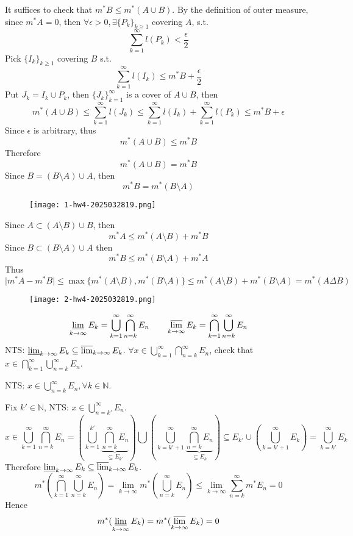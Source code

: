 It suffices to check that $m^{*}B\leq m^{*}(A\cup B)$. By the definition of outer measure, since $m^{*}A=0$, then $\forall\epsilon>0,\exists \{ P_k \}_{k\geq1}$ covering $A$, s.t.
\[
\sum_{k=1}^{\infty} l(P_k)<\frac{\epsilon}{2}
\]
Pick $\{ I_k \}_{k\geq1}$ covering $B$ s.t.
\[
\sum_{k=1}^{\infty} l(I_k)\leq m^{*}B+\frac{\epsilon}{2}
\]
Put $J_k=I_k\cup P_k$, then $\{ J_k \}_{k=1}^{\infty}$ is a cover of $A\cup B$, then
\[
m^{*}(A\cup B)\leq \sum_{k=1}^{\infty} l(J_k)\leq \sum_{k=1}^{\infty} l(I_k)+\sum_{k=1}^{\infty} l(P_k)\leq m^{*}B+\epsilon
\]
Since $\epsilon$ is arbitrary, thus
\[
m^{*}(A\cup B)\leq m^{*}B
\]
Therefore
\[
m^{*}(A\cup B)=m^{*}B
\]
Since $B=(B\setminus A)\cup A$, then
\[
m^{*}B=m^{*}(B\setminus A)
\]
\begin{figure}[H]
\centering
\texttt{[image: 1-hw4-2025032819.png]}
\label{}
\end{figure}

Since $A\subset(A\setminus B)\cup B$, then
\[
m^{*}A\leq m^{*}(A\setminus B)+m^{*}B
\]
Since $B\subset(B\setminus A)\cup A$ then
\[
m^{*}B\leq m^{*}(B\setminus A)+m^{*}A
\]
Thus
\[
\lvert m^{*}A-m^{*}B \rvert\leq \max\{ m^{*}(A\setminus B),m^{*}(B\setminus A) \}\leq m^{*}(A\setminus B)+m^{*}(B\setminus A)=m^{*}(A\Delta B)
\]
\begin{figure}[H]
\centering
\texttt{[image: 2-hw4-2025032819.png]}
\label{}
\end{figure}
\[
\varliminf_{ k \to \infty } E_k=\bigcup_{k=1}^{\infty} \bigcap_{n=k}^{\infty} E_n \qquad \varlimsup_{ k \to \infty }E_k= \bigcap_{k=1}^{\infty} \bigcup_{n=k}^{\infty}E_n
\]
NTS: $\varliminf_{ k \to \infty }E_k\subseteq \varlimsup_{ k \to \infty }E_k$. $\forall x\in \bigcup_{k=1}^{\infty}\bigcap_{n=k}^{\infty}E_n$, check that $x\in \bigcap_{k=1}^{\infty}\bigcup_{n=k}^{\infty}E_n$.

NTS: $x\in \bigcup_{n=k}^{\infty}E_n,\forall k\in \mathbb{N}$.

Fix $k'\in \mathbb{N}$, NTS: $x\in \bigcup_{n=k'}^{\infty}E_n$.
\[
x\in \bigcup_{k=1}^{\infty} \bigcap_{n=k}^{\infty} E_n=\left( \bigcup_{k=1}^{k'} \underbrace{ \bigcap_{n=k}^{\infty} E_n }_{ \subseteq E_{k'} } \right)\bigcup \left( \bigcup_{k=k'+1}^{\infty} \underbrace{ \bigcap_{n=k}^{\infty} E_n }_{ \subseteq E_k } \right)\subseteq E_{k'}\cup\left( \bigcup_{k=k'+1}^{\infty} E_k \right)=\bigcup_{k=k'}^{\infty} E_k
\]
Therefore $\varliminf_{ k \to \infty }E_k\subseteq \varlimsup_{ k \to \infty }E_k$.
\[
m^{*}\left( \bigcap_{k=1}^{\infty} \bigcup_{n=k}^{\infty} E_n \right)=\lim_{ k \to \infty } m^{*}\left( \bigcup_{n=k}^{\infty} E_n \right)\leq \lim_{ k \to \infty } \sum_{n=k}^{\infty} m^{*}E_n=0
\]
Hence
\[
m^{*}(\varliminf_{ k \to \infty } E_k)=m^{*}(\varlimsup_{ k \to \infty } E_k)=0
\]